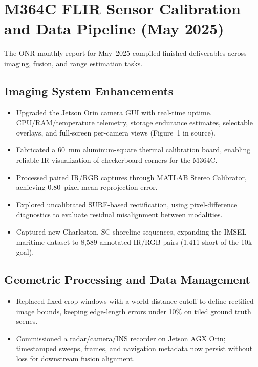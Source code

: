 \documentclass[12pt]{article}
\begin{document}
\section{M364C FLIR Sensor Calibration and Data Pipeline (May 2025)}
The ONR monthly report for May~2025 compiled finished deliverables across imaging, fusion, and range estimation tasks.\cite{monthly-report-may2025}
\subsection{Imaging System Enhancements}
\begin{itemize}[leftmargin=*,nosep]
  \item Upgraded the Jetson Orin camera GUI with real-time uptime, CPU/RAM/temperature telemetry, storage endurance estimates, selectable overlays, and full-screen per-camera views (Figure~1 in source).
  \item Fabricated a 60~mm aluminum-square thermal calibration board, enabling reliable IR visualization of checkerboard corners for the M364C.
  \item Processed paired IR/RGB captures through MATLAB Stereo Calibrator, achieving 0.80~pixel mean reprojection error.
  \item Explored uncalibrated SURF-based rectification, using pixel-difference diagnostics to evaluate residual misalignment between modalities.
  \item Captured new Charleston, SC shoreline sequences, expanding the IMSEL maritime dataset to 8{,}589 annotated IR/RGB pairs (1{,}411 short of the 10k goal).
\end{itemize}

\subsection{Geometric Processing and Data Management}
\begin{itemize}[leftmargin=*,nosep]
  \item Replaced fixed crop windows with a world-distance cutoff to define rectified image bounds, keeping edge-length errors under 10\% on tiled ground truth scenes.
  \item Commissioned a radar/camera/INS recorder on Jetson AGX Orin; timestamped sweeps, frames, and navigation metadata now persist without loss for downstream fusion alignment.
\end{itemize}
\end{document}
